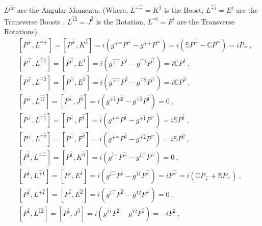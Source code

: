\documentclass[12pt,a4paper]{report}
\begin{document}
$L^{\hat{\mu}\hat{\nu}}$ are the Angular Momenta. (Where, $L^{\hat{-}\hat{+}}=K^\hat{3}$ is  the Boost, $L^{\hat{+}\hat{i}}=E^\hat{i}$ are the  Transverse Boosts , $L^{\hat{1}\hat{2}}=J^\hat{3}$ is the Rotation, $L^{\hat{-}\hat{i}}=F^\hat{i}$ are the  Transverse Rotations). 
\begin{align*}
    &\left[P^{\hat{+}},L^{\hat{-}\hat{+}}\right]=\left[P^{\hat{+}},K^{\hat{3}}\right]=i\left(g^{\hat{+}\hat{-}}P^{\hat{+}}-g^{\hat{+}\hat{+}}P^{\hat{-}}\right)=i\left(\mathbb{S}P^{\hat{+}}-\mathbb{C}P^{\hat{-}}\right)=iP_{\hat{-}}~,\\
    &\left[P^{\hat{+}},L^{\hat{+}\hat{1}}\right]=\left[P^{\hat{+}},E^\hat{1}\right]=i\left(g^{\hat{+}\hat{+}}P^{\hat{1}}-g^{\hat{+}\hat{1}}P^{\hat{+}}\right)=i\mathbb{C}P^{\hat{1}}~,\\
    &\left[P^{\hat{+}},L^{\hat{+}\hat{2}}\right]=\left[P^{\hat{+}},E^\hat{2}\right]=i\left(g^{\hat{+}\hat{+}}P^{\hat{2}}-g^{\hat{+}\hat{2}}P^{\hat{+}}\right)=i\mathbb{C}P^{\hat{2}}~,\\
    &\left[P^{\hat{+}},L^{\hat{1}\hat{2}}\right]=\left[P^{\hat{+}},J^\hat{3}\right]=i\left(g^{\hat{+}\hat{1}}P^{\hat{2}}-g^{\hat{+}\hat{2}}P^{\hat{1}}\right)=0~,\\
    &\left[P^{\hat{+}},L^{\hat{-}\hat{1}}\right]=\left[P^{\hat{+}},F^\hat{1}\right]=i\left(g^{\hat{+}\hat{-}}P^{\hat{1}}-g^{\hat{+}\hat{1}}P^{\hat{-}}\right)=i\mathbb{S}P^{\hat{1}}~,\\
    &\left[P^{\hat{+}},L^{\hat{-}\hat{2}}\right]=\left[P^{\hat{+}},F^\hat{2}\right]=i\left(g^{\hat{+}\hat{-}}P^{\hat{2}}-g^{\hat{+}\hat{2}}P^{\hat{-}}\right)=i\mathbb{S}P^{\hat{2}}~,\\
    &\left[P^{\hat{1}},L^{\hat{-}\hat{+}}\right]=\left[P^{\hat{1}},K^\hat{3}\right]=i\left(g^{\hat{1}\hat{-}}P^{\hat{+}}-g^{\hat{1}\hat{+}}P^{\hat{-}}\right)=0~,\\
    &\left[P^{\hat{1}},L^{\hat{+}\hat{1}}\right]=\left[P^{\hat{1}},E^\hat{1}\right]=i\left(g^{\hat{1}\hat{+}}P^{\hat{1}}-g^{\hat{1}\hat{1}}P^{\hat{+}}\right)=iP^{\hat{+}}=i\left(\mathbb{C}P_{\hat{+}}+\mathbb{S}P_{\hat{-}}\right)~,\\
    &\left[P^{\hat{1}},L^{\hat{+}\hat{2}}\right]=\left[P^{\hat{1}},E^\hat{2}\right]=i\left(g^{\hat{1}\hat{+}}P^{\hat{2}}-g^{\hat{1}\hat{2}}P^{\hat{+}}\right)=0~,\\
    &\left[P^{\hat{1}},L^{\hat{1}\hat{2}}\right]=\left[P^{\hat{1}},J^\hat{3}\right]=i\left(g^{\hat{1}\hat{1}}P^{\hat{2}}-g^{\hat{1}\hat{2}}P^{\hat{1}}\right)=-iP^{\hat{2}}~,\\

\end{align*}
\end{document}
